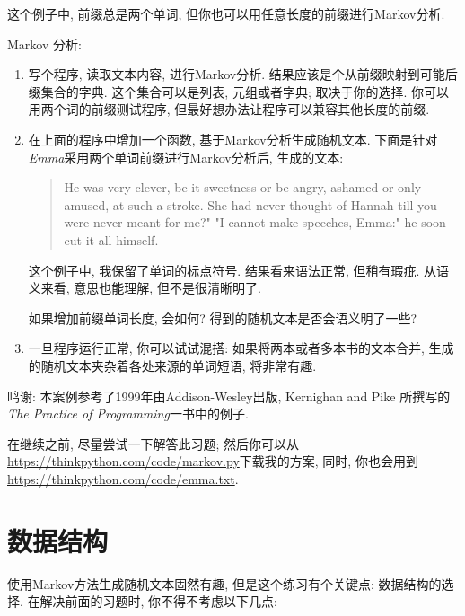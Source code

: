 \documentclass[10pt]{book}
\begin{document}
这个例子中, 前缀总是两个单词, 但你也可以用任意长度的前缀进行Markov分析. 

\begin{exercise}

Markov 分析:

\begin{enumerate}

\item 写个程序, 读取文本内容, 进行Markov分析. 
结果应该是个从前缀映射到可能后缀集合的字典. 
这个集合可以是列表, 元组或者字典; 取决于你的选择. 
你可以用两个词的前缀测试程序, 但最好想办法让程序可以兼容其他长度的前缀. 

\item 在上面的程序中增加一个函数, 基于Markov分析生成随机文本. 
下面是针对 {\em Emma}采用两个单词前缀进行Markov分析后, 生成的文本:

\begin{quote}
He was very clever, be it sweetness or be angry, ashamed or only
amused, at such a stroke. She had never thought of Hannah till you
were never meant for me?" "I cannot make speeches, Emma:" he soon cut
it all himself.
\end{quote}

这个例子中, 我保留了单词的标点符号. 
结果看来语法正常, 但稍有瑕疵. 
从语义来看, 意思也能理解, 但不是很清晰明了. 

如果增加前缀单词长度, 会如何? 得到的随机文本是否会语义明了一些?

\item 一旦程序运行正常, 你可以试试混搭: 
如果将两本或者多本书的文本合并, 生成的随机文本夹杂着各处来源的单词短语, 将非常有趣. 

\end{enumerate}

鸣谢: 本案例参考了1999年由Addison-Wesley出版, Kernighan and Pike
所撰写的{\em The Practice of Programming}一书中的例子. 
\end{exercise}

在继续之前, 尽量尝试一下解答此习题; 然后你可以从 
\url{https://thinkpython.com/code/markov.py}下载我的方案, 同时, 
你也会用到\url{https://thinkpython.com/code/emma.txt}.


\section{数据结构}

使用Markov方法生成随机文本固然有趣, 但是这个练习有个关键点:
数据结构的选择. 在解决前面的习题时, 你不得不考虑以下几点:
\end{document}
